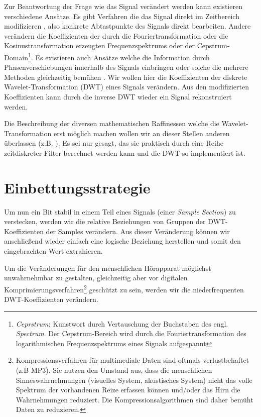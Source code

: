 Zur Beantwortung der Frage wie das Signal ver\"andert werden kann existieren verschiedene Ans\"atze. Es gibt Verfahren die das Signal direkt im Zeitbereich modifizieren \cite{bassia2001robust}\cite{lie2006robust}, also konkrete Abtastpunkte des Signals direkt bearbeiten. Andere ver\"andern die Koeffizienten der durch die Fouriertransformation oder die Kosinustransformation erzeugten Frequenzspektrums \cite{chang2012location}\cite{??} oder der Cepstrum-Domain\footnote{\textit{Ceprstrum}: Kunstwort durch Vertauschung der Buchstaben des engl. \textit{Spectrum}. Der Cepstrum-Bereich wird durch die Fouriertransformation des logarithmischen Frequenzspektrums eines Signals aufgespannt}\cite{lee2000digital}\cite{li2000transparent}. Es existieren auch Ans\"atze welche die Information durch Phasenverschiebungen innerhalb des Signals einbringen \cite{dong2004data}\cite{ansari2004data} oder solche die mehrere Methoden gleichzeitig bem\"uhen \cite{chang2012location}\cite{lei2012multipurpose}. Wir wollen hier die Koeffizienten der diskrete Wavelet-Transformation (DWT) eines Signals ver\"andern. Aus den modifizierten Koeffizienten kann durch die inverse DWT wieder ein Signal rekonstruiert werden. 
	
Die Beschreibung der diversen mathematischen Raffinessen welche die Wavelet-Transformation erst m\"oglich machen wollen wir an dieser Stellen anderen \"uberlassen (z.B. \cite{??}). Es sei nur gesagt, das sie praktisch durch eine Reihe zeitdiskreter Filter berechnet werden kann und die DWT so implementiert ist. 

\section{Einbettungsstrategie}
\label{sec:embeddingstragety}

Um nun ein Bit stabil in einem Teil eines Signals (einer \textit{Sample Section}) zu verstecken, werden wir die relative Beziehungen von Gruppen der DWT-Koeffizienten der Samples verändern. Aus dieser Veränderung können wir anschließend wieder einfach eine logische Beziehung herstellen und somit den eingebrachten Wert extrahieren. 

Um die Veränderungen für den menschlichen Hörapparat möglichst unwahrnehmbar zu gestalten, gleichzeitig aber vor digitalen Komprimierungsverfahren\footnote{Kompressionsverfahren für multimediale Daten sind oftmals verlustbehaftet (z.B MP3). Sie nutzen den Umstand aus, dass die menschlichen Sinneswahrnehmungen (visuelles System, akustisches System) nicht das volle Spektrum der vorhandenen Reize erfassen können und/oder das Hirn die Wahrnehmungen reduziert. Die Kompressionsalgorithmen sind daher bemüht \grqq{} Daten zu reduzieren.} geschützt zu sein, werden wir die niederfrequenten DWT-Koeffizienten verändern. 

